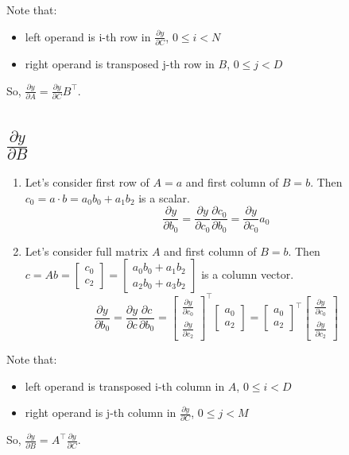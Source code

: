 \documentclass[12pt]{article}
\begin{document}
Note that:

\begin{itemize}
\item left operand is i-th row in $\frac{\partial y}{\partial C}$, $0 \le i < N$
\item right operand is transposed j-th row in $B$, $0 \le j < D$  
\end{itemize}

So, $\frac{\partial y}{\partial A} = \frac{\partial y}{\partial C} B^\top$.

\section{$\frac{\partial y}{\partial B}$}

\begin{enumerate}
\item Let's consider first row of $A = a$ and first column of $B = b$.  
Then $c_0 = a \cdot b = a_0b_0 + a_1b_2$ is a scalar.  
\[
	\frac{\partial y}{\partial b_0} = 
	\frac{\partial y}{\partial c_0} \frac{\partial c_0}{\partial b_0} = 
	\frac{\partial y}{\partial c_0} a_0
\]
\item Let's consider full matrix $A$ and first column of $B = b$.  
Then $
c = Ab = 
\begin{bmatrix}c_0 \\ c_2\end{bmatrix} =
\begin{bmatrix}a_0b_0 + a_1b_2 \\ a_2b_0 + a_3b_2\end{bmatrix}
$ is a column vector.  
\[
	\frac{\partial y}{\partial b_0} = 
	\frac{\partial y}{\partial c} \frac{\partial c}{\partial b_0} = 
	\begin{bmatrix}
		\frac{\partial y}{\partial c_0} \\ \frac{\partial y}{\partial c_2}
	\end{bmatrix} ^\top	
	\begin{bmatrix} 
		a_0 \\ a_2
	\end{bmatrix} =
	\begin{bmatrix} 
		a_0 \\ a_2
	\end{bmatrix} ^\top
	\begin{bmatrix}
		\frac{\partial y}{\partial c_0} \\ \frac{\partial y}{\partial c_2}
	\end{bmatrix}
\] 
\end{enumerate}

Note that:

\begin{itemize}
\item left operand is transposed i-th column in $A$, $0 \le i < D$  
\item right operand is j-th column in $\frac{\partial y}{\partial C}$, $0 \le j < M$  
\end{itemize}

So, $\frac{\partial y}{\partial B} = A^\top \frac{\partial y}{\partial C}$.
\end{document}
